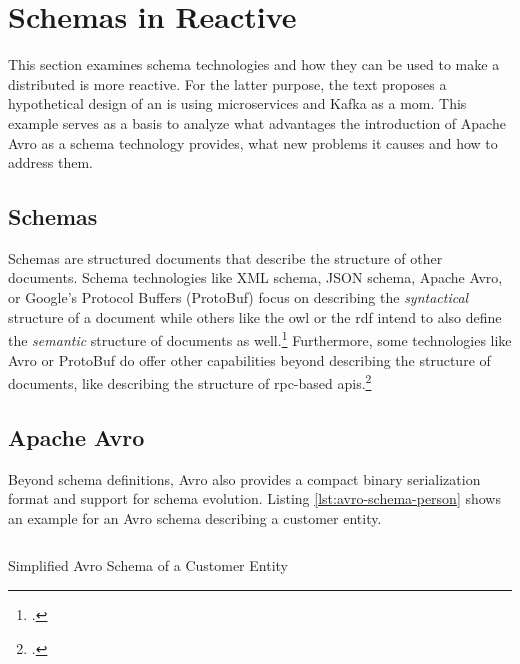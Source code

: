 
\section{Schemas in Reactive }\label{sec:schemas-in-reactive-is}

This section examines schema technologies and how they can be used to make a distributed \gls{is} more reactive.
For the latter purpose, the text proposes a hypothetical design of an \gls{is} using microservices and Kafka as a \gls{mom}.
This example serves as a basis to analyze what advantages the introduction of Apache Avro as a schema technology provides, what new problems it causes and how to address them.

\subsection{Schemas}

Schemas are structured documents that describe the structure of other documents.
Schema technologies like XML schema, JSON schema, Apache Avro, or Google's Protocol Buffers (ProtoBuf) focus on describing the \emph{syntactical} structure of a document while others like the \gls{owl} or the \gls{rdf} intend to also define the \emph{semantic} structure of documents as well.\footcites{xmlschema}{jsonschema}{avro}{protobuf}{owl}{rdf}
Furthermore, some technologies like Avro or ProtoBuf do offer other capabilities beyond describing the structure of documents, like describing the structure of \gls{rpc}-based \glspl{api}.\footcites{avro}{protobuf}

\subsection{Apache Avro}

Beyond schema definitions, Avro also provides a compact binary serialization format and support for schema evolution.
Listing \ref{lst:avro-schema-person} shows an example for an Avro schema describing a customer entity.
\parencite{avro}

\begin{listing}[H]
  \inputminted{json}{assets/src/Customer.avsc}
  \caption{Simplified Avro Schema of a Customer Entity}\label{lst:avro-schema-person}
\end{listing}

